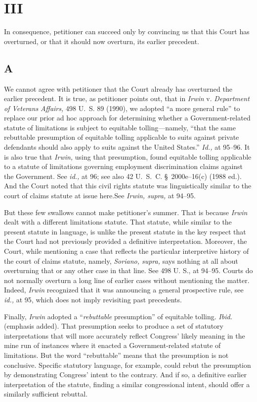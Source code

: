 \section{III}

  In consequence, petitioner can succeed only by convincing us that this Court has overturned, or that it should now overturn, its earlier precedent.

\subsection{A}

  We cannot agree with petitioner that the Court already has overturned the earlier precedent. It is true, as petitioner points out, that in \emph{Irwin} v. \emph{Department of Veterans} \newpage  \emph{Affairs,} 498 U.~S. 89 (1990), we adopted ``a more general rule'' to replace our prior ad hoc approach for determining whether a Government-related statute of limitations is subject to equitable tolling---namely, ``that the same rebuttable presumption of equitable tolling applicable to suits against private defendants should also apply to suits against the United States.'' \emph{Id.,} at 95--96. It is also true that \emph{Irwin,} using that presumption, found equitable tolling applicable to a statute of limitations governing employment discrimination claims against the Government. See \emph{id.,} at 96; see also 42 U.~S.~C. \S~2000e--16(c) (1988 ed.). And the Court noted that this civil rights statute was linguistically similar to the court of claims statute at issue here.See \emph{Irwin, supra,} at 94--95.

  But these few swallows cannot make petitioner's summer. That is because \emph{Irwin} dealt with a different limitations statute. That statute, while similar to the present statute in language, is unlike the present statute in the key respect that the Court had not previously provided a definitive interpretation. Moreover, the Court, while mentioning a case that reflects the particular interpretive history of the court of claims statute, namely, \emph{Soriano, supra,} says nothing at all about overturning that or any other case in that line. See 498 U. S., at 94--95. Courts do not normally overturn a long line of earlier cases without mentioning the matter. Indeed, \emph{Irwin} recognized that it was announcing a general prospective rule, see \emph{id.,} at 95, which does not imply revisiting past precedents.

  Finally, \emph{Irwin} adopted a ``\emph{rebuttable} presumption'' of equitable tolling. \emph{Ibid.} (emphasis added). That presumption seeks to produce a set of statutory interpretations that will more accurately reflect Congress' likely meaning in the mine run of instances where it enacted a Government-related statute of limitations. But the word ``rebuttable'' means that the presumption is not conclusive. Specific statutory lan\newpage guage, for example, could rebut the presumption by demonstrating Congress' intent to the contrary. And if so, a definitive earlier interpretation of the statute, finding a similar congressional intent, should offer a similarly sufficient rebuttal.

